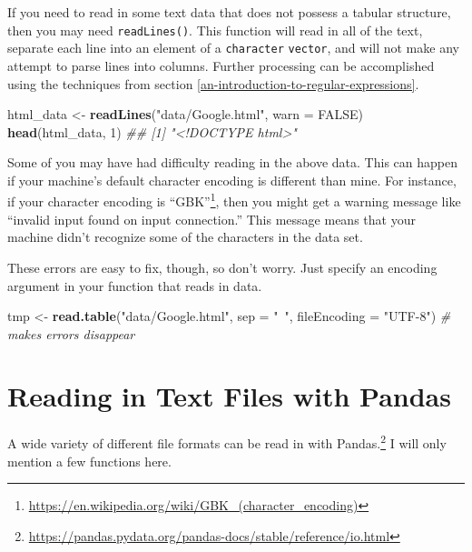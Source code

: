 \documentclass[12pt,krantz2]{krantz}
\makeatletter
\newenvironment{Shaded}{\begin{snugshade}}{\end{snugshade}}
\newcommand{\CommentTok}[1]{\textcolor[rgb]{0.37,0.37,0.37}{\textit{#1}}}
\newcommand{\DataTypeTok}[1]{\textcolor[rgb]{0.27,0.27,0.27}{#1}}
\newcommand{\DecValTok}[1]{\textcolor[rgb]{0.06,0.06,0.06}{#1}}
\newcommand{\KeywordTok}[1]{\textcolor[rgb]{0.27,0.27,0.27}{\textbf{#1}}}
\newcommand{\NormalTok}[1]{#1}
\newcommand{\OtherTok}[1]{\textcolor[rgb]{0.37,0.37,0.37}{#1}}
\newcommand{\StringTok}[1]{\textcolor[rgb]{0.5,0.5,0.5}{#1}}
\renewcommand{\href}[2]{#2\footnote{\url{#1}}}
\newenvironment{kframe}{%
\medskip{}
\setlength{\fboxsep}{.8em}
 \def\at@end@of@kframe{}%
 \ifinner\ifhmode%
  \def\at@end@of@kframe{\end{minipage}}%
  \begin{minipage}{\columnwidth}%
 \fi\fi%
 \def\FrameCommand##1{\hskip\@totalleftmargin \hskip-\fboxsep
 \colorbox{shadecolor}{##1}\hskip-\fboxsep
     \hskip-\linewidth \hskip-\@totalleftmargin \hskip\columnwidth}%
 \MakeFramed {\advance\hsize-\width
   \@totalleftmargin\z@ \linewidth\hsize
   \@setminipage}}%
 {\par\unskip\endMakeFramed%
 \at@end@of@kframe}
\renewenvironment{Shaded}{\begin{kframe}}{\end{kframe}}
\makeatother
\begin{document}
If you need to read in some text data that does not possess a tabular structure, then you may need \texttt{readLines()}. This function will read in all of the text, separate each line into an element of a \texttt{character} \texttt{vector}, and will not make any attempt to parse lines into columns. Further processing can be accomplished using the techniques from section \ref{an-introduction-to-regular-expressions}.

\begin{Shaded}
\begin{Highlighting}[]
\NormalTok{html_data <-}\StringTok{ }\KeywordTok{readLines}\NormalTok{(}\StringTok{"data/Google.html"}\NormalTok{, }\DataTypeTok{warn =} \OtherTok{FALSE}\NormalTok{)}
\KeywordTok{head}\NormalTok{(html_data, }\DecValTok{1}\NormalTok{)}
\CommentTok{## [1] "<!DOCTYPE html>"}
\end{Highlighting}
\end{Shaded}

Some of you may have had difficulty reading in the above data. This can happen if your machine's default character encoding is different than mine. For instance, if your character encoding is \href{https://en.wikipedia.org/wiki/GBK_(character_encoding)}{``GBK''}, then you might get a warning message like ``invalid input found on input connection.'' This message means that your machine didn't recognize some of the characters in the data set.

These errors are easy to fix, though, so don't worry. Just specify an encoding argument in your function that reads in data.

\begin{Shaded}
\begin{Highlighting}[]
\NormalTok{tmp <-}\StringTok{ }\KeywordTok{read.table}\NormalTok{(}\StringTok{"data/Google.html"}\NormalTok{, }\DataTypeTok{sep =} \StringTok{"~"}\NormalTok{, }
                  \DataTypeTok{fileEncoding =} \StringTok{"UTF-8"}\NormalTok{) }\CommentTok{# makes errors disappear}
\end{Highlighting}
\end{Shaded}

\hypertarget{reading-in-text-files-with-pandas}{%
\section{Reading in Text Files with Pandas}\label{reading-in-text-files-with-pandas}}

A \href{https://pandas.pydata.org/pandas-docs/stable/reference/io.html}{wide variety of different file formats can be read in with Pandas.} I will only mention a few functions here.
\end{document}
